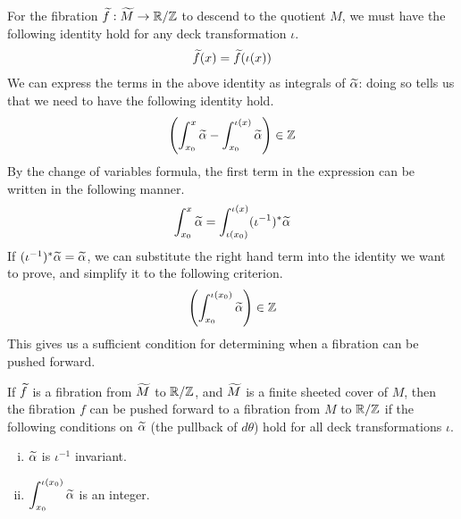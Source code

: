 For the fibration $\widetilde{f}: \widetilde{M} \to \mathbb{R}/\mathbb{Z}$ to descend to the quotient $M$, we must have the
following identity hold for any deck transformation $\iota$.
\begin{align*}
  \widetilde{f}(x) = \widetilde{f}(\iota(x))
\end{align*}
We can express the terms in the above identity as integrals of $\widetilde{\alpha}$: doing so tells us that
we need to have the following identity hold.
\begin{align*}
  \left(   \int_{x_0}^x \widetilde{\alpha} - \int_{x_0}^{\iota(x)} \widetilde{\alpha}\right) \in \mathbb{Z}
\end{align*}
By the change of variables formula, the first term in the expression can be written in the
following manner.
\begin{align*}
  \int_{x_0}^x \widetilde{\alpha} = \int_{\iota(x_0)}^{\iota(x)} (\iota^{-1})^{\ast} \widetilde{\alpha}
\end{align*}
If $( \iota^{-1})^{\ast}\widetilde{\alpha} = \widetilde{\alpha}$, we can substitute the right hand term into the identity we want
to prove, and simplify it to the following criterion.
\begin{align*}
  \left(   \int_{x_0}^{\iota(x_0)} \widetilde{\alpha}\right) \in \mathbb{Z}
\end{align*}
This gives us a sufficient condition for determining when a fibration can be pushed forward.
\begin{lem}
  If $\widetilde{f}$ is a fibration from $\widetilde{M}$ to $\mathbb{R}/\mathbb{Z}$, and $\widetilde{M}$ is a finite sheeted cover of
  $M$, then the fibration $f$ can be pushed forward to a fibration from $M$ to $\mathbb{R}/\mathbb{Z}$ if the
  following conditions on $\widetilde{\alpha}$ (the pullback of $d\theta$) hold for all deck
  transformations $\iota$.
  \begin{enumerate}[(i)]
  \item $\widetilde{\alpha}$ is $\iota^{-1}$ invariant.
  \item $\displaystyle \int_{x_0}^{\iota(x_0)} \widetilde{\alpha}$ is an integer.
  \end{enumerate}
\end{lem}